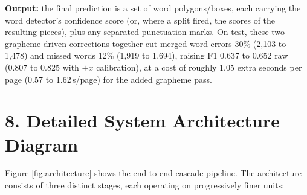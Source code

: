 \documentclass[10.5pt,a4paper]{article}
\begin{document}
\textbf{Output:} the final prediction is a set of word polygons/boxes, each carrying the word detector's confidence score (or, where a split fired, the scores of the resulting pieces), plus any separated punctuation marks. On test, these two grapheme-driven corrections together cut merged-word errors 30\% (2{,}103 to 1{,}478) and missed words 12\% (1{,}919 to 1{,}694), raising F1 0.637 to 0.652 raw (0.807 to 0.825 with $+x$ calibration), at a cost of roughly 1.05 extra seconds per page (0.57 to 1.62\,s/page) for the added grapheme pass.

\section*{8. Detailed System Architecture Diagram}

Figure \ref{fig:architecture} shows the end-to-end cascade pipeline. The architecture consists of three distinct stages, each operating on progressively finer units:
\end{document}
